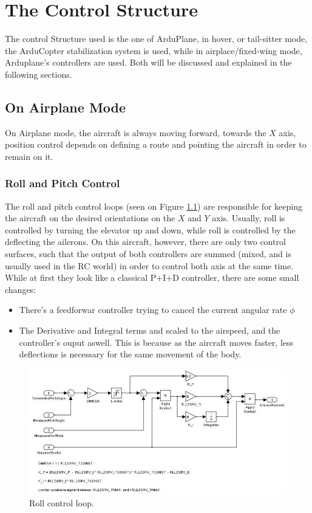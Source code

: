 \chapter{The Control Structure} \label{chap:control}

The control Structure used is the one of ArduPlane, in hover, or tail-sitter mode, the ArduCopter stabilization system is used, while in airplace/fixed-wing mode, Arduplane's controllers are used. Both will be discussed and explained in the following sections.

\section{On Airplane Mode}

On Airplane mode, the aircraft is always moving forward, towards the $X$ axis, position control depends on defining a route and pointing the aircraft in order to remain on it.

\subsection{Roll and Pitch Control}

The roll and pitch control loops (seen on Figure \ref{fig:roll_loop}) are responsible for keeping the aircraft on the desired orientations on the $X$ and $Y$ axis. Usually, roll is controlled by turning the elevator up and down, while roll is controlled by the deflecting the ailerons. On this aircraft, however, there are only two control surfaces, such that the output of both controllers are summed (mixed, and is usually used in the RC world) in order to control both axis at the same time.
While at first they look like a classical P+I+D controller, there are some small changes:

\begin{itemize}
\item There's a feedforwar controller trying to cancel the current angular rate $\dot{\phi}$
\item The Derivative and Integral terms and scaled to the airspeed, and the controller's ouput aswell. This is because  as the aircraft moves faster, less deflections is necessary for the same movement of the body.
\end{itemize}


\begin{figure}[H]
\centering
  \includegraphics[width=\linewidth]{figs/roll_control_loop.jpg}
  \caption{Roll control loop.}
  \label{fig:roll_loop}
\end{figure}

